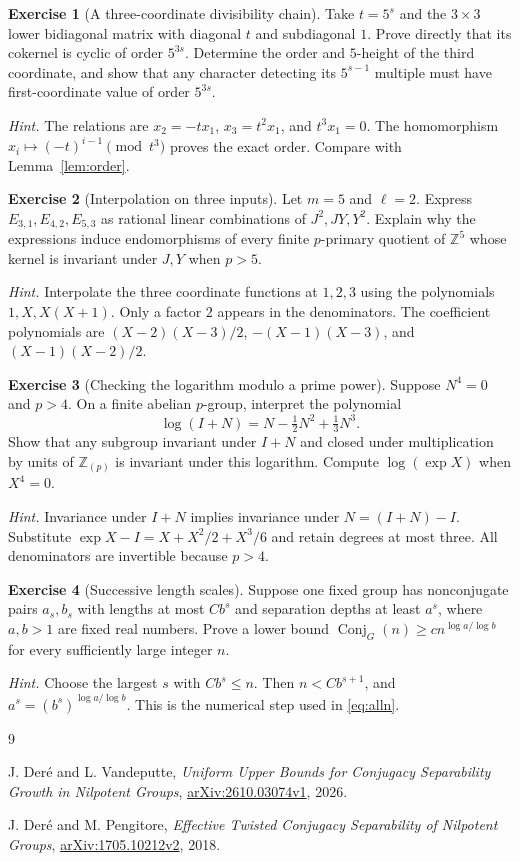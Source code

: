 \documentclass[11pt]{article}
\numberwithin{equation}{section}
\theoremstyle{definition}
\newtheorem{exercise}{Exercise}[section]
\theoremstyle{remark}
\newcommand{\Z}{\mathbb Z}
\newcommand{\Conj}{\operatorname{Conj}}
\begin{document}
\begin{exercise}[A three-coordinate divisibility chain]
Take $t=5^s$ and the $3\times3$ lower bidiagonal matrix with diagonal $t$ and subdiagonal $1$. Prove directly that its cokernel is cyclic of order $5^{3s}$. Determine the order and $5$-height of the third coordinate, and show that any character detecting its $5^{s-1}$ multiple must have first-coordinate value of order $5^{3s}$.
\end{exercise}
\noindent\emph{Hint.} The relations are $x_2=-tx_1$, $x_3=t^2x_1$, and $t^3x_1=0$. The homomorphism $x_i\mapsto(-t)^{i-1}\pmod{t^3}$ proves the exact order. Compare with Lemma~\ref{lem:order}.

\begin{exercise}[Interpolation on three inputs]
Let $m=5$ and $\ell=2$. Express $E_{3,1},E_{4,2},E_{5,3}$ as rational linear combinations of $J^2,JY,Y^2$. Explain why the expressions induce endomorphisms of every finite $p$-primary quotient of $\Z^5$ whose kernel is invariant under $J,Y$ when $p>5$.
\end{exercise}
\noindent\emph{Hint.} Interpolate the three coordinate functions at $1,2,3$ using the polynomials $1,X,X(X+1)$. Only a factor $2$ appears in the denominators. The coefficient polynomials are $(X-2)(X-3)/2$, $-(X-1)(X-3)$, and $(X-1)(X-2)/2$.

\begin{exercise}[Checking the logarithm modulo a prime power]
Suppose $N^4=0$ and $p>4$. On a finite abelian $p$-group, interpret the polynomial
\[
\log(I+N)=N-\tfrac12N^2+\tfrac13N^3.
\]
Show that any subgroup invariant under $I+N$ and closed under multiplication by units of $\Z_{(p)}$ is invariant under this logarithm. Compute $\log(\exp X)$ when $X^4=0$.
\end{exercise}
\noindent\emph{Hint.} Invariance under $I+N$ implies invariance under $N=(I+N)-I$. Substitute $\exp X-I=X+X^2/2+X^3/6$ and retain degrees at most three. All denominators are invertible because $p>4$.

\begin{exercise}[Successive length scales]
Suppose one fixed group has nonconjugate pairs $a_s,b_s$ with lengths at most $C b^s$ and separation depths at least $a^s$, where $a,b>1$ are fixed real numbers. Prove a lower bound $\Conj_G(n)\ge c n^{\log a/\log b}$ for every sufficiently large integer $n$.
\end{exercise}
\noindent\emph{Hint.} Choose the largest $s$ with $Cb^s\le n$. Then $n<Cb^{s+1}$, and $a^s=(b^s)^{\log a/\log b}$. This is the numerical step used in \eqref{eq:alln}.

\begin{thebibliography}{9}
J. Der\'e and L. Vandeputte,
\emph{Uniform Upper Bounds for Conjugacy Separability Growth in Nilpotent Groups},
\href{https://arxiv.org/abs/2610.03074v1}{arXiv:2610.03074v1}, 2026.

J. Der\'e and M. Pengitore,
\emph{Effective Twisted Conjugacy Separability of Nilpotent Groups},
\href{https://arxiv.org/abs/1705.10212v2}{arXiv:1705.10212v2}, 2018.
\end{thebibliography}
\end{document}
